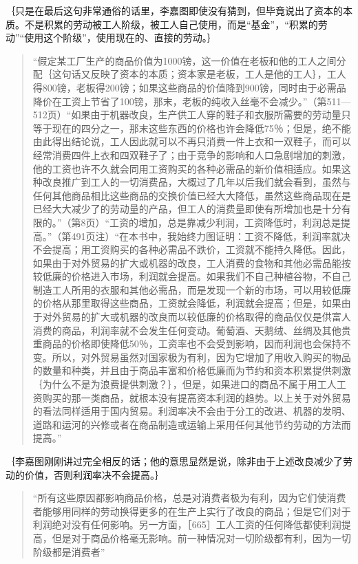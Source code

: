 ｛只是在最后这句非常通俗的话里，李嘉图即使没有猜到，但毕竟说出了资本的本质。不是积累的劳动被工人阶级，被工人自己使用，而是“基金”，“积累的劳动”“使用这个阶级”，使用现在的、直接的劳动。｝

\begin{quote}{“假定某工厂生产的商品价值为1000镑，这一价值在老板和他的工人之间分配｛这句话又反映了资本的本质；资本家是老板，工人是他的工人｝，工人得800镑，老板得200镑；如果这些商品的价值降到900镑，同时由于必需品降价在工资上节省了100镑，那末，老板的纯收入丝毫不会减少。”（第511—512页）“如果由于机器改良，生产供工人穿的鞋子和衣服所需要的劳动量只等于现在的四分之一，那末这些东西的价格也许会降低75％；但是，绝不能由此得出结论说，工人因此就可以不再只消费一件上衣和一双鞋子，而可以经常消费四件上衣和四双鞋子了；由于竞争的影响和人口急剧增加的刺激，他的工资也许不久就会同用工资购买的各种必需品的新价值相适应。如果这种改良推广到工人的一切消费品，大概过了几年以后我们就会看到，虽然与任何其他商品相比这些商品的交换价值已经大大降低，虽然这些商品现在是已经大大减少了的劳动量的产品，但工人的消费量即使有所增加也是十分有限的。”（第8页）“工资的增加，总是靠减少利润，工资降低时，利润总是提高。”（第491页注）“在本书中，我始终力图证明：工资不降低，利润率就决不会提高；用工资购买的各种必需品不跌价，工资就不能持久降低。因此，如果由于对外贸易的扩大或机器的改良，工人消费的食物和其他必需品能按较低廉的价格进入市场，利润就会提高。如果我们不自己种植谷物，不自己制造工人所用的衣服和其他必需品，而是发现一个新的市场，可以用较低廉的价格从那里取得这些商品，工资就会降低，利润就会提高；但是，如果由于对外贸易的扩大或机器的改良而以较低廉的价格取得的商品仅仅是供富人消费的商品，利润率就不会发生任何变动。葡萄酒、天鹅绒、丝绸及其他贵重商品的价格即使降低50％，工资率也不会受到影响，因而利润也会保持不变。所以，对外贸易虽然对国家极为有利，因为它增加了用收入购买的物品的数量和种类，并且由于商品丰富和价格低廉而为节约和资本积累提供刺激｛为什么不是为浪费提供刺激？｝，但是，如果进口的商品不属于用工人工资购买的那一类商品，就根本没有提高资本利润的趋势。以上关于对外贸易的看法同样适用于国内贸易。利润率决不会由于分工的改进、机器的发明、道路和运河的兴修或者在商品制造或运输上采用任何其他节约劳动的方法而提高。”}\end{quote}

｛李嘉图刚刚讲过完全相反的话；他的意思显然是说，除非由于上述改良减少了劳动的价值，否则利润率决不会提高。｝

\begin{quote}{“所有这些原因都影响商品价格，总是对消费者极为有利，因为它们使消费者能够用同样的劳动换得更多的在生产上实行了改良的商品；但是它们对于利润绝对没有任何影响。另一方面，［665］工人工资的任何降低都使利润提高，但是对于商品价格毫无影响。前一种情况对一切阶级都有利，因为一切阶级都是消费者”}\end{quote}

